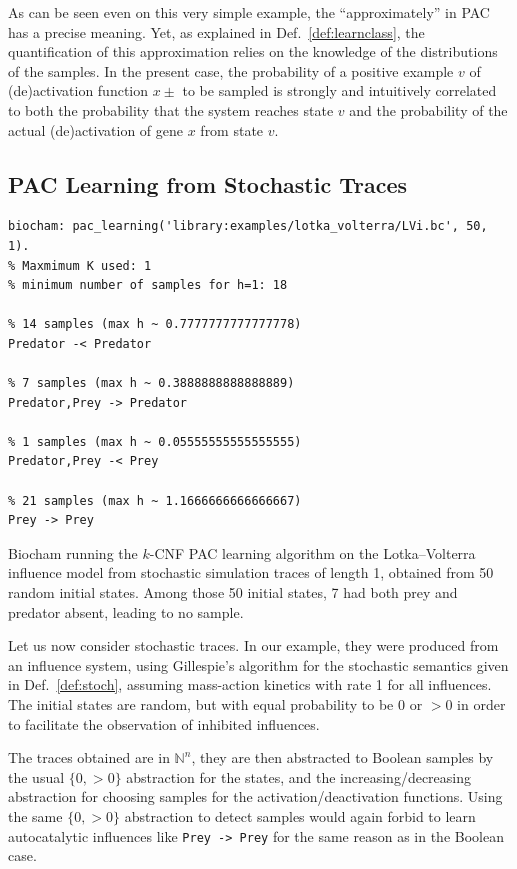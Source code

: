 \documentclass{llncs}
\begin{document}
As can be seen even on this very simple example, the ``approximately'' in PAC has a precise meaning. Yet, as explained in Def.~\ref{def:learnclass}, the quantification of this approximation relies on the knowledge of the distributions of the samples.
%
In the present case, the probability of a positive example $v$ of (de)activation function $x\pm$ to be sampled is strongly and intuitively correlated to both the probability that the system reaches state $v$ and the probability of the actual (de)activation of gene $x$ from state $v$. 


\subsection{PAC Learning from  Stochastic Traces}


\begin{listfig}[htb]
      \begin{lstlisting}
biocham: pac_learning('library:examples/lotka_volterra/LVi.bc', 50, 1).
% Maxmimum K used: 1
% minimum number of samples for h=1: 18

% 14 samples (max h ~ 0.7777777777777778)
Predator -< Predator

% 7 samples (max h ~ 0.3888888888888889)
Predator,Prey -> Predator

% 1 samples (max h ~ 0.05555555555555555)
Predator,Prey -< Prey

% 21 samples (max h ~ 1.1666666666666667)
Prey -> Prey
   \end{lstlisting}
   \caption{Biocham running the $k$-CNF PAC learning algorithm on the Lotka--Volterra
      influence model from stochastic simulation traces of length 1, obtained from 50 random initial states.
Among those 50 initial
     states, 7 had both prey and predator absent, leading to no sample.}\label{lst:stoch_lv}
\end{listfig}


Let us now consider stochastic traces. In our example, they were
produced from an influence system, using Gillespie's
algorithm for the stochastic semantics given in
Def.~\ref{def:stoch}, assuming mass-action kinetics with rate 1 for all influences.
The initial states are random, but with equal probability to be 0 or $>0$ in
order to facilitate the observation of inhibited influences.

The traces obtained are in ${\mathbb{N}}^n$, they are then abstracted to
Boolean samples by the usual $\{0, >0\}$ abstraction for the states, and the
increasing/decreasing abstraction for choosing samples for the
activation/deactivation functions. Using the same $\{0, >0\}$ abstraction to
detect samples would again forbid to learn autocatalytic influences like
\texttt{Prey -> Prey} for the same reason as in the Boolean case.
\end{document}
